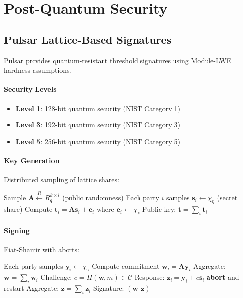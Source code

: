 \section{Post-Quantum Security}


\subsection{Pulsar Lattice-Based Signatures}

Pulsar provides quantum-resistant threshold signatures using Module-LWE hardness assumptions.

\paragraph{Security Levels}
\begin{itemize}
\item \textbf{Level 1}: 128-bit quantum security (NIST Category 1)
\item \textbf{Level 3}: 192-bit quantum security (NIST Category 3)
\item \textbf{Level 5}: 256-bit quantum security (NIST Category 5)
\end{itemize}

\paragraph{Key Generation} Distributed sampling of lattice shares:
\begin{algorithmic}[1]
\State Sample $\mathbf{A} \xleftarrow{R} R_q^{k \times l}$ (public randomness)
\State Each party $i$ samples $\mathbf{s}_i \leftarrow \chi_\eta$ (secret share)
\State Compute $\mathbf{t}_i = \mathbf{A} \mathbf{s}_i + \mathbf{e}_i$ where $\mathbf{e}_i \leftarrow \chi_\eta$
\State Public key: $\mathbf{t} = \sum_i \mathbf{t}_i$
\end{algorithmic}

\paragraph{Signing} Fiat-Shamir with aborts:
\begin{algorithmic}[1]
\State Each party samples $\mathbf{y}_i \leftarrow \chi_\gamma$
\State Compute commitment $\mathbf{w}_i = \mathbf{A} \mathbf{y}_i$
\State Aggregate: $\mathbf{w} = \sum_i \mathbf{w}_i$
\State Challenge: $c = H(\mathbf{w}, m) \in \mathcal{C}$
\State Response: $\mathbf{z}_i = \mathbf{y}_i + c \mathbf{s}_i$
 \textbf{abort} and restart
\EndIf
\State Aggregate: $\mathbf{z} = \sum_i \mathbf{z}_i$
\State Signature: $(\mathbf{w}, \mathbf{z})$
\end{algorithmic}

